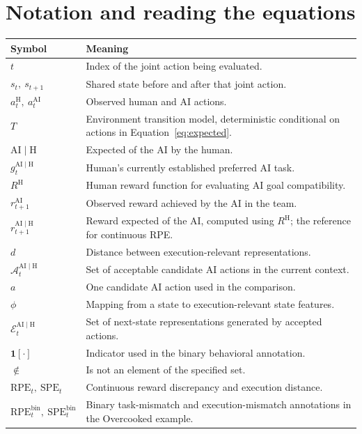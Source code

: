 \documentclass[11pt]{article}
\newcommand{\AIH}{\mathrm{AI}\mid\mathrm{H}}
\newcommand{\RPE}{\mathrm{RPE}}
\newcommand{\SPE}{\mathrm{SPE}}
\newcommand{\At}{\mathcal{A}_t^{\AIH}}
\newcommand{\Et}{\mathcal{E}_t^{\AIH}}
\newcommand{\gt}{g_t^{\AIH}}
\newcommand{\ind}{\mathbf{1}}
\begin{document}
\section{Notation and reading the equations}
\label{sec:notation}
\begin{table}[htbp]
 \centering\small
 \begin{tabularx}{\linewidth}{@{}lY@{}}
 \toprule
 Symbol & Meaning \\
 \midrule
 $t$ & Index of the joint action being evaluated. \\
 $s_t,\ s_{t+1}$ & Shared state before and after that joint action. \\
 $a_t^{\mathrm H},\ a_t^{\mathrm{AI}}$ & Observed human and AI actions. \\
 $T$ & Environment transition model, deterministic conditional on actions
 in Equation~\eqref{eq:expected}. \\
 $\AIH$ & Expected of the AI by the human. \\
 $\gt$ & Human's currently established preferred AI task. \\
 $R^{\mathrm H}$ & Human reward function for evaluating AI goal compatibility. \\
 $r_{t+1}^{\mathrm{AI}}$ & Observed reward achieved by the AI in the team. \\
 $r_{t+1}^{\AIH}$ & Reward expected of the AI, computed using $R^{\mathrm H}$;
 the reference for continuous RPE. \\
 $d$ & Distance between execution-relevant representations. \\
 $\At$ & Set of acceptable candidate AI actions in the current context. \\
 $a$ & One candidate AI action used in the comparison. \\
 $\phi$ & Mapping from a state to execution-relevant state features. \\
 $\Et$ & Set of next-state representations generated by accepted actions. \\
 $\ind[\cdot]$ & Indicator used in the binary behavioral annotation. \\
 $\notin$ & Is not an element of the specified set. \\
 $\RPE_t,\ \SPE_t$ & Continuous reward discrepancy and execution distance. \\
 $\RPE_t^{\mathrm{bin}},\ \SPE_t^{\mathrm{bin}}$ & Binary task-mismatch and
 execution-mismatch annotations in the Overcooked example. \\
 \bottomrule
 \end{tabularx}
\end{table}
\end{document}
